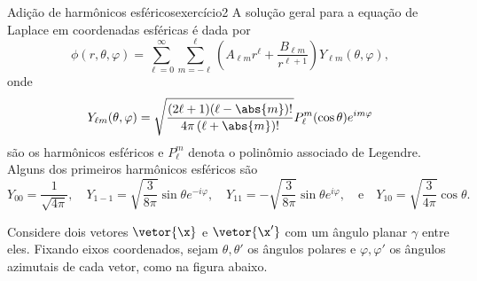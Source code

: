 \begin{exercício}{Adição de harmônicos esféricos}{exercício2}
    A solução geral para a equação de Laplace em coordenadas esféricas é dada por
    \begin{equation*}
        \phi(r, \theta, \varphi) = \sum_{\ell = 0}^\infty \sum_{m = -\ell}^\ell \left(A_{\ell m}r^\ell + \frac{B_{\ell m}}{r^{\ell + 1}}\right) Y_{\ell m}(\theta, \varphi),
    \end{equation*}
    onde
    \begin{equation*}
        Y_{\ell m}(\theta, \varphi) = \sqrt{\frac{(2\ell + 1)(\ell - \abs{m})!}{4\pi \left(\ell + \abs{m}\right)!}} P_\ell^m(\cos\theta)e^{im\varphi}
    \end{equation*}
    são os harmônicos esféricos e \(P_\ell^m\) denota o polinômio associado de Legendre. Alguns dos primeiros harmônicos esféricos são
    \begin{equation*}
        Y_{00} = \frac{1}{\sqrt{4\pi}},\quad
        Y_{1-1} = \sqrt{\frac{3}{8\pi}}\sin\theta e^{-i\varphi},\quad
        Y_{11} = -\sqrt{\frac{3}{8\pi}}\sin\theta e^{i\varphi},\quad\text{e}\quad
        Y_{10} = \sqrt{\frac{3}{4\pi}} \cos\theta.
    \end{equation*}

    Considere dois vetores \(\vetor{\x}\) e \(\vetor{\x'}\) com um ângulo planar \(\gamma\) entre eles. Fixando eixos coordenados, sejam \(\theta, \theta'\) os ângulos polares e \(\varphi, \varphi'\) os ângulos azimutais de cada vetor, como na figura abaixo.
    \begin{center}

\end{center}
\end{exercício}
